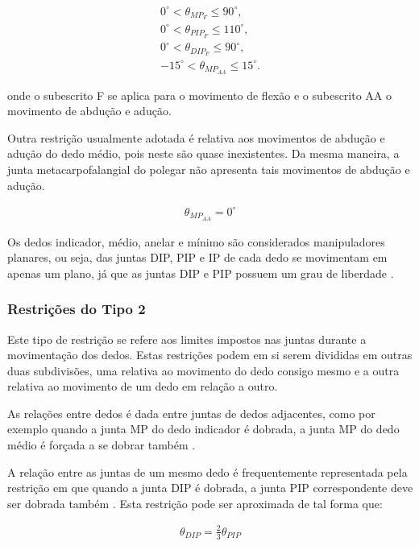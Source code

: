 \begin{align}
0^\circ < \theta_{MP_F} \leq 90^\circ, \\
0^\circ < \theta_{PIP_F} \leq 110^\circ, \\
0^\circ < \theta_{DIP_F} \leq 90^\circ, \\
-15^\circ < \theta_{MP_{AA}} \leq 15^\circ.
\end{align}

onde o subescrito F se aplica para o movimento de flexão e o subescrito AA o movimento de abdução e adução.

Outra restrição usualmente adotada é relativa aos movimentos de abdução e adução do dedo médio, pois neste são quase inexistentes. Da mesma maneira, a junta metacarpofalangial do polegar não apresenta tais movimentos de abdução e adução.

\begin{align}
\theta_{MP_{AA}} = 0^\circ
\end{align}

Os dedos indicador, médio, anelar e mínimo são considerados manipuladores planares, ou seja, das juntas DIP, PIP e IP de cada dedo se movimentam em apenas um plano, já que as juntas DIP e PIP possuem um grau de liberdade \cite{lin2000modeling}.

\subsubsection{Restrições do Tipo 2}\label{sssec:Tipo2}
Este tipo de restrição se refere aos limites impostos nas juntas durante a movimentação dos dedos. Estas restrições podem em si serem divididas em outras duas subdivisões, uma relativa ao movimento do dedo consigo mesmo e a outra relativa ao movimento de um dedo em relação a outro.

As relações entre dedos é dada entre juntas de dedos adjacentes, como por exemplo quando a junta MP do dedo indicador é dobrada, a junta MP do dedo médio é forçada a se dobrar também \cite{lin2000modeling}.

A relação entre as juntas de um mesmo dedo é frequentemente representada pela restrição em que quando a junta DIP é dobrada, a junta PIP correspondente deve ser dobrada também \cite{lin2000modeling}\cite{lee1995model}. Esta restrição pode ser aproximada de tal forma que:

\begin{align}
\theta_{DIP} = \frac{2}{3} \theta_{PIP} \label{relacao_dip_pip}
\end{align}

